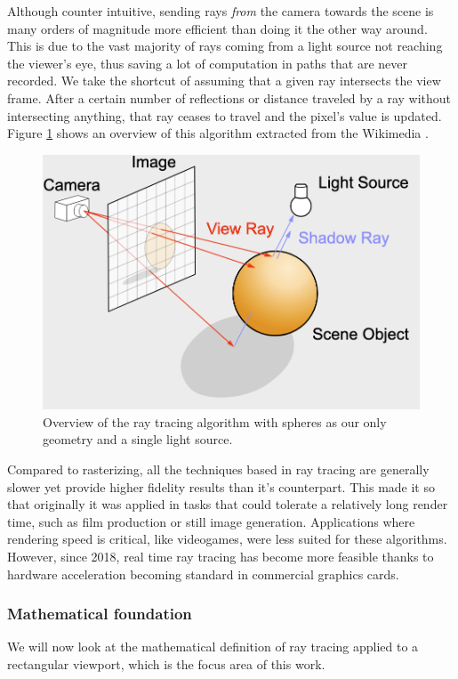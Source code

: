 Although counter intuitive, sending rays \textit{from} the camera towards the scene is many orders of magnitude more efficient than doing it the other way around. This is due to the vast majority of rays coming from a light source not reaching the viewer's eye, thus saving a lot of computation in paths that are never recorded. We take the shortcut of assuming that a given ray intersects the view frame. After a certain number of reflections or distance traveled by a ray without intersecting anything, that ray ceases to travel and the pixel's value is updated. Figure \ref{rt-overview-image} shows an overview of this algorithm extracted from the Wikimedia \cite{WikimediaRT}.


\begin{figure}[hbt!]
    \centering
    \includegraphics[width=1.0\textwidth]{figuras/RT-Diagram.png}
    \caption{Overview of the ray tracing algorithm with spheres as our only geometry and a single light source.}
    \label{rt-overview-image}
\end{figure}

Compared to rasterizing, all the techniques based in ray tracing are generally slower yet provide higher fidelity results than it's counterpart. This made it so that originally it was applied in tasks that could tolerate a relatively long render time, such as film production or still image generation. Applications where rendering speed is critical, like videogames, were less suited for these algorithms. However, since 2018, real time ray tracing has become more feasible thanks to hardware acceleration becoming standard in commercial graphics cards.

\subsubsection{Mathematical foundation}
We will now look at the mathematical definition of ray tracing applied to a rectangular viewport, which is the focus area of this work.

